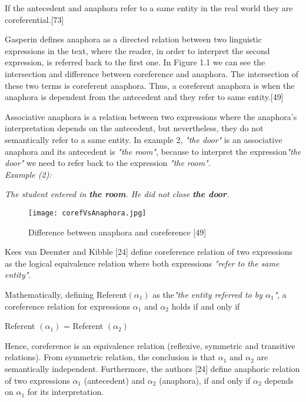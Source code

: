 If the antecedent and anaphora refer to a same entity in the real world they are coreferential.[73]

Gasperin defines anaphora as a directed relation between two linguistic expressions in the text, where the reader, in order to interpret the second expression, is referred back to the first one. In Figure 1.1 we can see the intersection and difference between coreference and anaphora. The intersection of these two terms is coreferent anaphora. Thus, a coreferent anaphora is when the anaphora is dependent from the antecedent and they refer to same entity.[49]

Associative anaphora is a relation between two expressions where the anaphora's interpretation depends on the antecedent, but nevertheless, they do not semantically refer to a same entity. In example 2, \emph{"the door"} is an associative anaphora and its antecedent is \emph{"the room"}, because to interpret the expression\emph{"the door"} we need to refer back to the expression \emph{"the room"}.\\

\emph{Example (2):}
\begin{changemargin}{10mm}{10mm} 
   \emph{  The student entered in \textbf{the room}. He did not close \textbf{ the door}.}
   \vspace{5mm} 
\end{changemargin}  
\begin{figure}[ht]
   \begin{center}
	  \texttt{[image: corefVsAnaphora.jpg]} 
 	  \caption[Difference between anaphora and coreference]{Difference between anaphora and coreference [49]}
	  \label{Figure 1}
   \end{center}
\end{figure}

Kees van Deemter and Kibble [24] define coreference relation of two expressions as the logical equivalence relation where both expressions \emph{"refer to the same entity"}.
 
Mathematically, defining Referent$(\alpha_1)$ as the\emph{"the entity referred to by $\alpha_1$"}, a coreference relation for expressions $\alpha_1$ and $\alpha_2$ holds if and only if 
\begin{center}
  Referent $(\alpha_1)$ = Referent $(\alpha_2)$
\end{center}
 
Hence, coreference is an equivalence relation (reflexive, symmetric and transitive relations). From symmetric relation, the conclusion is that $\alpha_1$ and $\alpha_2$ are semantically independent. Furthermore, the authors [24] define anaphoric relation of two expressions $\alpha_1$ (antecedent) and $\alpha_2$ (anaphora), if and only if $\alpha_2$ depends on $\alpha_1$ for its interpretation. 
 
